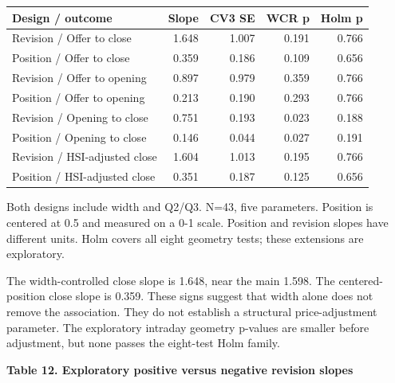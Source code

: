 \documentclass[10pt,a4paper]{article}
\begin{document}
{\small\renewcommand{\arraystretch}{1.10}\begin{tabularx}{\textwidth}{@{}Xrrrr@{}}\toprule

\textbf{Design / outcome} & \textbf{Slope} & \textbf{CV3 SE} & \textbf{WCR p} & \textbf{Holm p} \\\midrule

Revision / Offer to close & 1.648 & 1.007 & 0.191 & 0.766 \\

Position / Offer to close & 0.359 & 0.186 & 0.109 & 0.656 \\

Revision / Offer to opening & 0.897 & 0.979 & 0.359 & 0.766 \\

Position / Offer to opening & 0.213 & 0.190 & 0.293 & 0.766 \\

Revision / Opening to close & 0.751 & 0.193 & 0.023 & 0.188 \\

Position / Opening to close & 0.146 & 0.044 & 0.027 & 0.191 \\

Revision / HSI-adjusted close & 1.604 & 1.013 & 0.195 & 0.766 \\

Position / HSI-adjusted close & 0.351 & 0.187 & 0.125 & 0.656 \\

\bottomrule\end{tabularx}}\par

{\footnotesize Both designs include width and Q2/Q3. N=43, five parameters. Position is centered at 0.5 and measured on a 0-1 scale. Position and revision slopes have different units. Holm covers all eight geometry tests; these extensions are exploratory.}\par

The width-controlled close slope is 1.648, near the main 1.598. The centered-position close slope is 0.359. These signs suggest that width alone does not remove the association. They do not establish a structural price-adjustment parameter. The exploratory intraday geometry p-values are smaller before adjustment, but none passes the eight-test Holm family.

\par\addvspace{5pt}\textbf{Table 12. Exploratory positive versus negative revision slopes}\par\nobreak\vspace{2pt}
\end{document}
